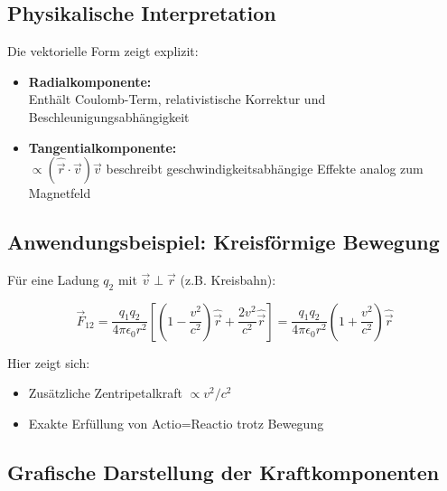 \subsection{Physikalische Interpretation}
Die vektorielle Form zeigt explizit:
\begin{itemize}
\item \textbf{Radialkomponente:}\\Enthält Coulomb-Term, relativistische Korrektur und Beschleunigungsabhängigkeit
\item \textbf{Tangentialkomponente:}\\$\propto (\hat{\vec{r}}\cdot\vec{v})\vec{v}$ beschreibt geschwindigkeitsabhängige Effekte analog zum Magnetfeld
\end{itemize}

\subsection{Anwendungsbeispiel: Kreisförmige Bewegung}
Für eine Ladung $q_2$ mit $\vec{v} \perp \vec{r}$ (z.B. Kreisbahn):

\begin{equation}
\vec{F}_{12} = \frac{q_1 q_2}{4\pi\epsilon_0 r^2} \left[
\left(1 - \frac{v^2}{c^2}\right)\hat{\vec{r}} + \frac{2v^2}{c^2}\hat{\vec{r}}
\right] = \frac{q_1 q_2}{4\pi\epsilon_0 r^2} \left(1 + \frac{v^2}{c^2}\right)\hat{\vec{r}}
\end{equation}

Hier zeigt sich:
\begin{itemize}
\item Zusätzliche Zentripetalkraft $\propto v^2/c^2$
\item Exakte Erfüllung von Actio=Reactio trotz Bewegung
\end{itemize}

\subsection{Grafische Darstellung der Kraftkomponenten}

